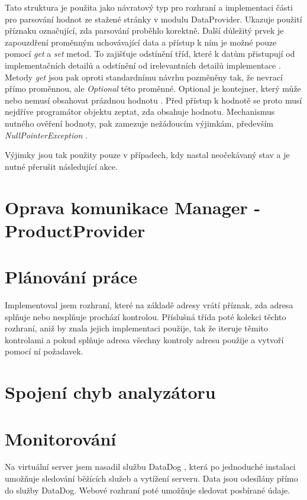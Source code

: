 \documentclass[thesis=B,czech]{FITthesis}[2012/06/26]
\begin{document}
Tato struktura je použita jako návratový typ pro rozhraní a implementaci části pro parsování hodnot 
ze stažené stránky v modulu DataProvider. Ukazuje použití příznaku označující, zda parsování proběhlo korektně. Další důležitý prvek
je zapouzdření proměnným uchovávající data a přístup k ním je možné pouze pomocí \textit{get} a \textit{set} metod. To zajišťuje 
odstínění tříd, které k datům přistupují od implementačních detailů a odstínění od irelevantních detailů implementace \cite{encapsulation}.
Metody \textit{get} jsou pak oproti standardnímu návrhu pozměněny tak, že nevrací přímo proměnnou, ale \textit{Optional} této proměnné.
Optional je kontejner, který může nebo nemusí obsahovat prázdnou hodnotu \cite{optional}. Před přístup k hodnotě se proto musí nejdříve
programátor objektu zeptat, zda obsahuje hodnotu. Mechanismus nutného ověření hodnoty, pak zamezuje nežádoucím výjimkám, především \textit{NullPointerException} \cite{nullPointerException}.
\par
Výjimky jsou tak použity pouze v případech, kdy nastal neočekávaný stav a je nutné přerušit následující akce. 



\section{Oprava komunikace Manager - ProductProvider}


\section{Plánování práce}
Implementoval jsem rozhraní, které na základě adresy 
vrátí příznak, zda adresa splňuje nebo nesplňuje prochází kontrolou. Příslušná třída poté
kolekci těchto rozhraní, aniž by znala jejich implementaci použije, tak že iteruje těmito kontrolami a pokud
splňuje adresa všechny kontroly adresu použije a vytvoří pomocí ní požadavek.

\section{Spojení chyb analyzátoru}


\section{Monitorování}
Na virtuální server jsem nasadil službu DataDog \cite{dataDog}, která po jednoduché instalaci umožňuje sledování běžících služeb
a vytížení serveru. Data jsou odesílány přímo do služby DataDog. Webové rozhraní poté umožňuje sledovat posbírané údaje.
\end{document}
